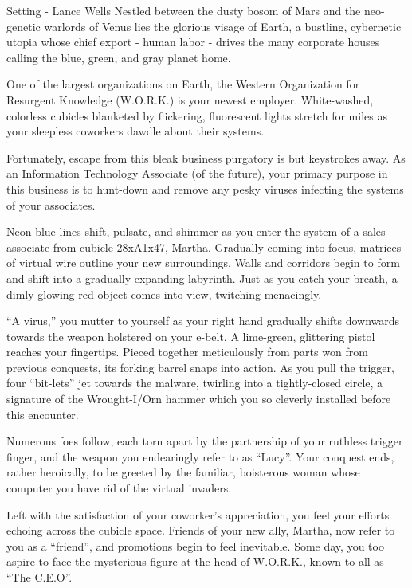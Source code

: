 \documentclass[12pt]{report}
\begin{document}
\begin{section}{Setting - Lance Wells}
Nestled between the dusty bosom of Mars and the neo-genetic warlords of
Venus lies the glorious visage of Earth, a bustling, cybernetic utopia whose
chief export - human labor - drives the many corporate houses calling the
blue, green, and gray planet home.

One of the largest organizations on Earth, the Western Organization for
Resurgent Knowledge (W.O.R.K.) is your newest employer. White-washed,
colorless cubicles blanketed by flickering, fluorescent lights stretch for
miles as your sleepless coworkers dawdle about their systems.

Fortunately, escape from this bleak business purgatory is but keystrokes
away. As an Information Technology Associate (of the future), your primary
purpose in this business is to hunt-down and remove any pesky viruses
infecting the systems of your associates.

Neon-blue lines shift, pulsate, and shimmer as you enter the system of a
sales associate from cubicle 28xA1x47, Martha. Gradually coming into focus,
matrices of virtual wire outline your new surroundings. Walls and corridors
begin to form and shift into a gradually expanding labyrinth. Just as you
catch your breath, a dimly glowing red object comes into view, twitching
menacingly.

``A virus,'' you mutter to yourself as your right hand gradually shifts
downwards towards the weapon holstered on your e-belt. A lime-green,
glittering pistol reaches your fingertips. Pieced together meticulously from
parts won from previous conquests, its forking barrel snaps into action. As
you pull the trigger, four ``bit-lets'' jet towards the malware, twirling
into a tightly-closed circle, a signature of the Wrought-I/Orn hammer which
you so cleverly installed before this encounter.

Numerous foes follow, each torn apart by the partnership of your ruthless
trigger finger, and the weapon you endearingly refer to as ``Lucy''. Your
conquest ends, rather heroically, to be greeted by the familiar, boisterous
woman whose computer you have rid of the virtual invaders.

Left with the satisfaction of your coworker's appreciation, you feel your
efforts echoing across the cubicle space. Friends of your new ally, Martha,
now refer to you as a ``friend'', and promotions begin to feel inevitable.
Some day, you too aspire to face the mysterious figure at the head of
W.O.R.K., known to all as ``The C.E.O''.
\end{section}
\end{document}
